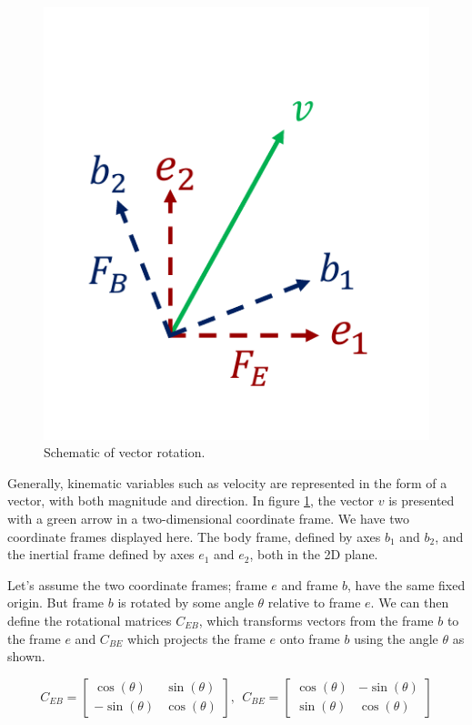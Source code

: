 \begin{figure}[!htb]
\begin{center}
\includegraphics[scale=0.290]{img/coordinate_transforms/vector_rotation.jpeg}
\end{center}
\caption{Schematic of vector rotation.}
\label{vector_rotation}
\end{figure}


Generally, kinematic variables such as velocity are represented in the form of a vector, with both magnitude and direction. In figure \ref{vector_rotation}, the vector $v$ is presented with a green arrow in a two-dimensional coordinate frame. We have two coordinate frames displayed here. The body frame, defined by axes $b_1$ and $b_2$, and the inertial frame defined by axes $e_1$ and $e_2$, both in the 2D plane. 

Let's assume the two coordinate frames; frame $e$ and frame $b$, have the same fixed origin. But frame $b$ is rotated by some angle $\theta$ relative to frame $e$. We can then define the rotational matrices $C_{EB}$, which transforms vectors from the frame $b$ to the frame $e$ and $C_{BE}$ which projects the frame $e$ onto frame $b$ using the angle $\theta$ as shown.

\begin{equation}
C_{EB} = 
\begin{bmatrix}
 \cos(\theta) & \sin(\theta) \\
 -\sin(\theta) & \cos(\theta) 
\end{bmatrix}, ~~
C_{BE} =
\begin{bmatrix}
 \cos(\theta) & -\sin(\theta) \\
 \sin(\theta) & \cos(\theta)
\end{bmatrix} 
\end{equation}

